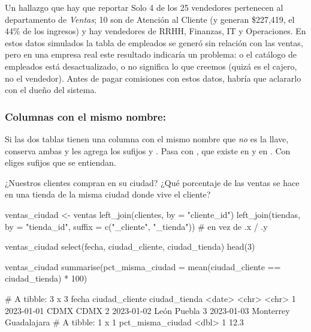 \begin{negocio}{Un hallazgo que hay que reportar}
Solo 4 de los 25 vendedores pertenecen al departamento de \emph{Ventas};
10 son de Atención al Cliente (y generan \$227,419, el 44\% de los
ingresos) y hay vendedores de RRHH, Finanzas, IT y Operaciones. En estos datos simulados la
tabla de empleados se generó sin relación con las ventas, pero en una
empresa real este resultado indicaría un problema: o el catálogo de
empleados está desactualizado, o  no significa lo que
creemos (quizá es el cajero, no el vendedor). Antes de pagar comisiones con
estos datos, habría que aclararlo con el dueño del sistema.
\end{negocio}

\subsubsection{Columnas con el mismo nombre: \texorpdfstring{}{suffix}}

Si las dos tablas tienen una columna con el mismo nombre que \emph{no} es la
llave,  conserva ambas y les agrega los sufijos  y
. Pasa con , que existe en  y en
. Con  eliges sufijos que se entiendan.

\begin{ejemplo}{¿Nuestros clientes compran en su ciudad?}
¿Qué porcentaje de las ventas se hace en una tienda de la misma ciudad donde
vive el cliente?
\end{ejemplo}

\begin{rcode}
ventas_ciudad <- ventas %
  left_join(clientes, by = "cliente_id") %
  left_join(tiendas, by = "tienda_id",
            suffix = c("_cliente", "_tienda"))   # en vez de .x / .y

ventas_ciudad %
  select(fecha, ciudad_cliente, ciudad_tienda) %
  head(3)

ventas_ciudad %
  summarise(pct_misma_ciudad =
              mean(ciudad_cliente == ciudad_tienda) * 100)
\end{rcode}
\begin{rsalida}
# A tibble: 3 x 3
  fecha      ciudad_cliente ciudad_tienda
  <date>     <chr>          <chr>        
1 2023-01-01 CDMX           CDMX         
2 2023-01-02 León           Puebla       
3 2023-01-03 Monterrey      Guadalajara  
# A tibble: 1 x 1
  pct_misma_ciudad
             <dbl>
1             12.3
\end{rsalida}

